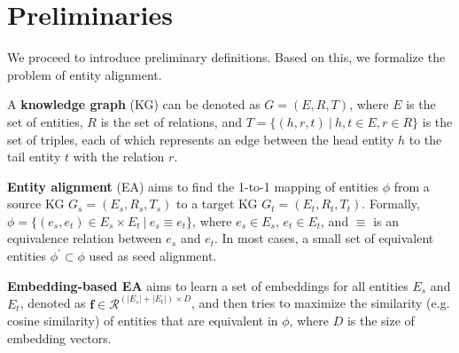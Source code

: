 \section{Preliminaries}
\label{sec:define}
We proceed to introduce preliminary definitions. Based on this, we formalize the problem of entity alignment.

\vspace{-2mm}
\begin{myDef}
A \textbf{knowledge graph} (KG) can be denoted as $G = (E,R,T)$, where $E$ is the set of entities, $R$ is the set of relations, and $T=\{(h,r,t)~|~h,t \in E, r \in R\}$ is the set of triples, each of which represents an edge between the head entity $h$ to the tail entity $t$ with the relation $r$.
\end{myDef}

\vspace{-3mm}
\begin{myDef}
\label{sec:problem_statement}
\textbf{Entity alignment} (EA) \cite{OpenEA2020VLDB} aims to find the 1-to-1 mapping of entities $\phi$ from a source KG $G_s = (E_s,R_s,T_s)$ to a target KG $G_t = (E_t,R_t,T_t)$. 
Formally, $\phi = \{(e_s, e_t) \in E_s \times E_t~|~e_s \equiv e_t\}$, where
$e_s \in E_s$, $e_t \in E_t$, and $\equiv$ is an equivalence relation between $e_s$ and $e_t$.
In most cases, a small set of equivalent entities $\phi^{\prime} \subset \phi$  used as seed alignment.
\end{myDef}
 
\vspace{-2mm}
\begin{myDef}
\textbf{Embedding-based EA} aims to learn a set of embeddings for all entities $E_s$ and $E_t$, denoted as $\mathbf{f}\in \mathcal{R}^{(|E_s|+|E_t|)\times D}$, and then tries to maximize the similarity (e.g. cosine similarity) of entities that are equivalent in $\phi$, where $D$ is the size of embedding vectors.
\end{myDef}